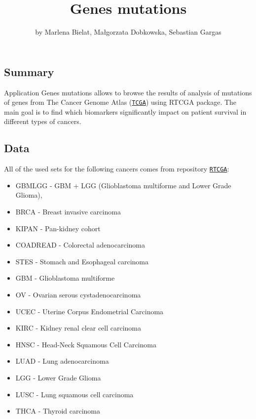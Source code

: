 \title{Genes mutations}
\author{by Marlena Bielat, Małgorzata Dobkowska, Sebastian Gargas}

\maketitle


\subsection{Summary}\label{summary}

Application Genes mutations allows to browse the results of analysis of
mutations of genes from The Cancer Genome Atlas (\href{http://cancergenome.nih.gov/}{\nolinkurl{TCGA}}) using RTCGA package. The main goal is to find which biomarkers significantly impact on patient
survival in different types of cancers.

\subsection{Data}\label{data}

All of the used sets for the following cancers comes from repository \href{https://github.com/RTCGA/RTCGA}{\nolinkurl{RTCGA}}:

\begin{itemize}
\itemsep1pt\parskip0pt
\item
  GBMLGG - GBM + LGG (Glioblastoma multiforme and Lower Grade Glioma),
\item
  BRCA - Breast invasive carcinoma
\item
  KIPAN - Pan-kidney cohort
\item
  COADREAD - Colorectal adenocarcinoma
\item
  STES - Stomach and Esophageal carcinoma
\item
  GBM - Glioblastoma multiforme
\item
  OV - Ovarian serous cystadenocarcinoma
\item
  UCEC - Uterine Corpus Endometrial Carcinoma
\item
  KIRC - Kidney renal clear cell carcinoma
\item
  HNSC - Head-Neck Squamous Cell Carcinoma
\item
  LUAD - Lung adenocarcinoma
\item
  LGG - Lower Grade Glioma
\item
  LUSC - Lung squamous cell carcinoma
\item
  THCA - Thyroid carcinoma
\end{itemize}

